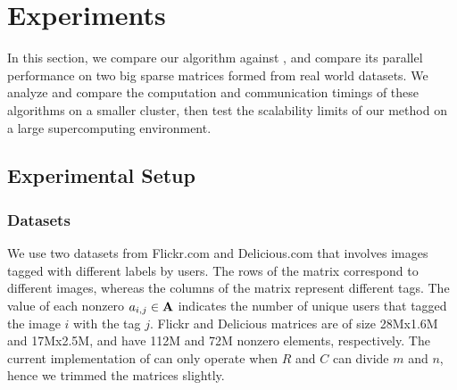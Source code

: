 \section{Experiments}
\label{sec:experiment}
\newcommand{\NLS}{LUC }


In this section, we compare our algorithm \distspnmf against \mpifaun, and compare its parallel performance on two big sparse matrices formed from real world datasets.
We analyze and compare the computation and communication timings of these algorithms on a smaller cluster, then test the scalability limits of our method on a large supercomputing environment.

\subsection{Experimental Setup}

\subsubsection{Datasets}\label{sec:datasets}

We use two datasets from Flickr.com and Delicious.com that involves images tagged with different labels by users.
The rows of the matrix correspond to different images, whereas the columns of the matrix represent different tags. The value of each nonzero $a_{i,j} \in \mathbf{A}$ indicates the number of unique users that tagged the image $i$ with the tag $j$.
Flickr and Delicious matrices are of size 28Mx1.6M and 17Mx2.5M, and have 112M and 72M nonzero elements, respectively.
The current implementation of \mpifaun can only operate when $R$ and $C$ can divide $m$ and $n$, hence we trimmed the matrices slightly.

